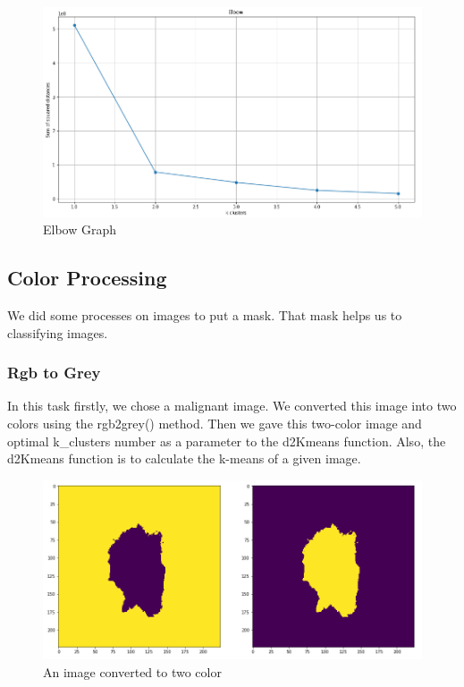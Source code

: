\documentclass[onecolumn]{article}
\begin{document}
\begin{figure}[H]
\centering
  \includegraphics[scale=0.48]{images/elbow.PNG}
  \caption{Elbow Graph}
  \label{fig:4}
\end{figure}


\subsection{Color Processing}
We did some processes on images to put a mask. That mask helps us to classifying images.



\subsubsection{Rgb to Grey}
In this task firstly, we chose a malignant image. We converted this image into two colors using the rgb2grey() method. Then we gave this two-color image and optimal k\_clusters number as a parameter to the d2Kmeans function. Also, the d2Kmeans function is to calculate the k-means of a given image.

\begin{figure}[H]
\centering
  \includegraphics[scale=0.38]{images/rgb2grey.PNG}
  \caption{An image converted to two color}
  \label{fig:5}
\end{figure}
\end{document}
